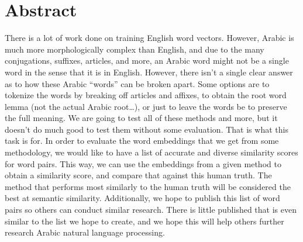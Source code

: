 \section*{Abstract}

There is a lot of work done on training English word vectors.
However, Arabic is much more morphologically complex than English, and due to the many conjugations, suffixes, articles, and more, an Arabic word might not be a single word in the sense that it is in English.
However, there isn’t a single clear answer as to how these Arabic “words” can be broken apart.
Some options are to tokenize the words by breaking off articles and affixes, to obtain the root word lemma (not the actual Arabic root…), or just to leave the words be to preserve the full meaning.
We are going to test all of these methods and more, but it doesn’t do much good to test them without some evaluation.
That is what this task is for.
In order to evaluate the word embeddings that we get from some methodology, we would like to have a list of accurate and diverse similarity scores for word pairs.
This way, we can use the embeddings from a given method to obtain a similarity score, and compare that against this human truth.
The method that performs most similarly to the human truth will be considered the best at semantic similarity.
Additionally, we hope to publish this list of word pairs so others can conduct similar research.
There is little published that is even similar to the list we hope to create, and we hope this will help others further research Arabic natural language processing.